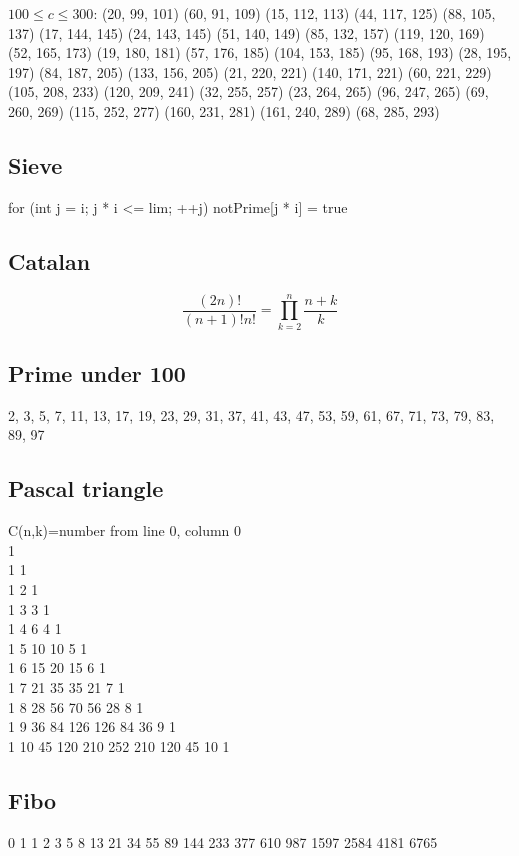 \documentclass[A4 paper, 12pt, oneside]{article}
\begin{document}
\begin{landscape}
\begin{multicols}{2}
	$100 \leq c \leq 300$:
	(20, 99, 101)	(60, 91, 109)	(15, 112, 113)	(44, 117, 125)
(88, 105, 137)	(17, 144, 145)	(24, 143, 145)	(51, 140, 149)
(85, 132, 157)	(119, 120, 169)	(52, 165, 173)	(19, 180, 181)
(57, 176, 185)	(104, 153, 185)	(95, 168, 193)	(28, 195, 197)
(84, 187, 205)	(133, 156, 205)	(21, 220, 221)	(140, 171, 221)
(60, 221, 229)	(105, 208, 233)	(120, 209, 241)	(32, 255, 257)
(23, 264, 265)	(96, 247, 265)	(69, 260, 269)	(115, 252, 277)
(160, 231, 281)	(161, 240, 289)	(68, 285, 293)

	\subsection{Sieve}
	for (int j = i; j * i <= lim; ++j) notPrime[j * i] = true

	\subsection{Catalan}
	\[\frac{(2n)!}{(n + 1)!n!} = \prod_{k = 2}^n \frac{n + k}{k} \]

	\subsection{Prime under 100}
	2, 3, 5, 7, 11, 13, 17, 19, 23, 29, 31, 37, 41, 43, 47, 53, 59, 61, 67, 71, 73, 79, 83, 89, 97 
	\subsection{Pascal triangle}
C(n,k)=number from line 0, column 0\\
1\\
1 1\\
1 2 1\\ 
1 3 3 1\\ 
1 4 6 4 1\\ 
1 5 10 10 5 1\\ 
1 6 15 20 15 6 1\\ 
1 7 21 35 35 21 7 1\\
1 8 28 56 70 56 28 8 1\\ 
1 9 36 84 126 126 84 36 9 1\\
1 10 45 120 210 252 210 120 45 10 1
	\subsection{Fibo}
	0 1 1 2 3 5 8 13 21 34 55 89 144 233 377 610 987 1597 2584 4181 6765

\end{multicols}
\end{landscape}
\end{document}
